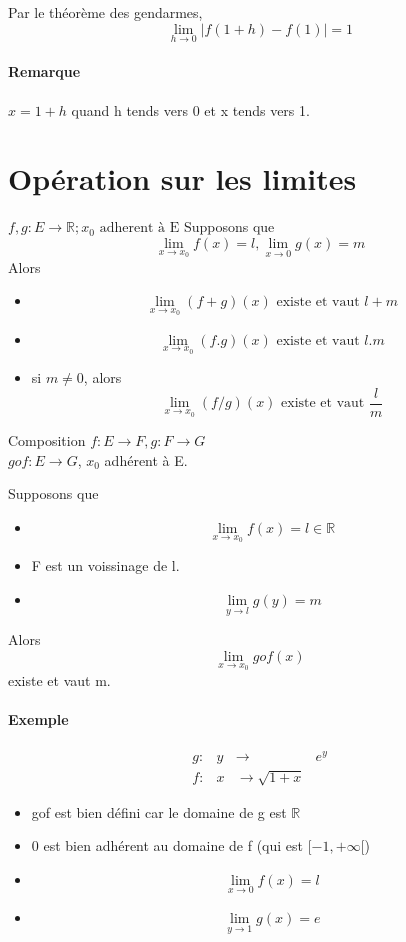 Par le théorème des gendarmes, \[\lim_{h \to 0} |f(1+h)-f(1)| =1\]

\paragraph{Remarque} $x = 1+h$ quand h tends vers 0 et x tends vers 1.

\section{Opération sur les limites}

$f, g : E \rightarrow \mathbb{R}; x_0 \text{ adherent à E}$
Supposons que \[\lim_{x \to x_0} f(x) = l, \lim_{x \to 0} g(x) = m\]
Alors 
\begin{itemize}
	\item[] \[\lim_{x \to x_0} (f+g)(x) \text{ existe et vaut } l+m\]
\item[] \[\lim_{x \to x_0} (f.g)(x) \text{ existe et vaut } l.m \]
	\item[] si $m \neq 0$, alors \[\lim_{x \to x_0} (f/g)(x) \text{ existe et vaut } \frac{l}{m}\]
\end{itemize}

Composition $f:E \rightarrow F, g:F \rightarrow G$
~\\
$gof : E \rightarrow G$, $x_0$ adhérent à E.

Supposons que \begin{itemize}
	\item[] \[\lim_{x \to x_0} f(x) = l \in \mathbb{R}\]
	\item[] F est un voissinage de l.
	\item[] \[\lim_{y \to l} g(y) = m\]
\end{itemize}

Alors \[\lim_{x \to x_0} gof(x)\] existe et vaut m.

\paragraph{Exemple} \begin{align*}
	g:& y&\rightarrow & e^y \\
	f:& x&\rightarrow \sqrt{1+x}
\end{align*}

\begin{itemize}
	\item[] gof est bien défini car le domaine de g est $\mathbb{R}$
	\item[] 0 est bien adhérent  au domaine de f (qui est $[-1, +\infty[$)
	\item[] \[\lim_{x \to 0} f(x) = l\]
	\item[] \[\lim_{y \to 1} g(x) = e\]
\end{itemize}


